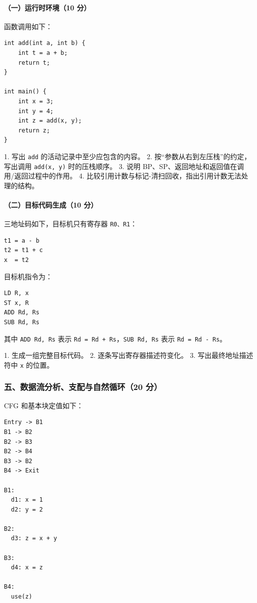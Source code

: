 \documentclass[UTF8]{ctexart}
\begin{document}
\paragraph*{（一）运行时环境（10 分）}

函数调用如下：

\begin{Verbatim}[fontsize=\small,breaklines=true]
int add(int a, int b) {
    int t = a + b;
    return t;
}

int main() {
    int x = 3;
    int y = 4;
    int z = add(x, y);
    return z;
}
\end{Verbatim}

1. 写出 \texttt{add} 的活动记录中至少应包含的内容。 2. 按“参数从右到左压栈”的约定，写出调用 \texttt{add(x, y)} 时的压栈顺序。 3. 说明 BP、SP、返回地址和返回值在调用/返回过程中的作用。 4. 比较引用计数与标记-清扫回收，指出引用计数无法处理的结构。

\paragraph*{（二）目标代码生成（10 分）}

三地址码如下，目标机只有寄存器 \texttt{R0、R1}：

\begin{Verbatim}[fontsize=\small,breaklines=true]
t1 = a - b
t2 = t1 + c
x  = t2
\end{Verbatim}

目标机指令为：

\begin{Verbatim}[fontsize=\small,breaklines=true]
LD R, x
ST x, R
ADD Rd, Rs
SUB Rd, Rs
\end{Verbatim}

其中 \texttt{ADD Rd, Rs} 表示 \texttt{Rd = Rd + Rs}，\texttt{SUB Rd, Rs} 表示 \texttt{Rd = Rd - Rs}。

1. 生成一组完整目标代码。 2. 逐条写出寄存器描述符变化。 3. 写出最终地址描述符中 \texttt{x} 的位置。

\subsubsection*{五、数据流分析、支配与自然循环（20 分）}

CFG 和基本块定值如下：

\begin{Verbatim}[fontsize=\small,breaklines=true]
Entry -> B1
B1 -> B2
B2 -> B3
B2 -> B4
B3 -> B2
B4 -> Exit

B1:
  d1: x = 1
  d2: y = 2

B2:
  d3: z = x + y

B3:
  d4: x = z

B4:
  use(z)
\end{Verbatim}
\end{document}
